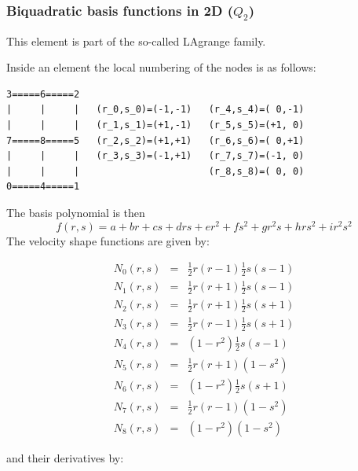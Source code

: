 \subsubsection{Biquadratic basis functions in 2D ($Q_2$)}

This element is part of the so-called LAgrange family. 

Inside an element the local numbering of the nodes is as follows:
\begin{verbatim}
3=====6=====2
|     |     |   (r_0,s_0)=(-1,-1)   (r_4,s_4)=( 0,-1)
|     |     |   (r_1,s_1)=(+1,-1)   (r_5,s_5)=(+1, 0)
7=====8=====5   (r_2,s_2)=(+1,+1)   (r_6,s_6)=( 0,+1)
|     |     |   (r_3,s_3)=(-1,+1)   (r_7,s_7)=(-1, 0)
|     |     |                       (r_8,s_8)=( 0, 0)
0=====4=====1
\end{verbatim}
The basis polynomial is then
\[
f(r,s) = a + br + cs + drs + er^2 + fs^2 + gr^2s + hrs^2 + i r^2s^2
\]
The velocity shape functions are given by:
\begin{mdframed}[backgroundcolor=blue!5]
\begin{eqnarray}
N_0(r,s)&=& \frac{1}{2}r(r-1)  \frac{1}{2}s(s-1)\nonumber\\
N_1(r,s)&=& \frac{1}{2}r(r+1)  \frac{1}{2}s(s-1)\nonumber\\
N_2(r,s)&=& \frac{1}{2}r(r+1)  \frac{1}{2}s(s+1)\nonumber\\
N_3(r,s)&=& \frac{1}{2}r(r-1)  \frac{1}{2}s(s+1)\nonumber\\
N_4(r,s)&=&     (1-r^2)  \frac{1}{2}s(s-1)\nonumber\\
N_5(r,s)&=& \frac{1}{2}r(r+1)      (1-s^2)\nonumber\\
N_6(r,s)&=&     (1-r^2)  \frac{1}{2}s(s+1)\nonumber\\
N_7(r,s)&=& \frac{1}{2}r(r-1)      (1-s^2)\nonumber\\
N_8(r,s)&=&     (1-r^2)      (1-s^2)\nonumber
\end{eqnarray}
\end{mdframed}
and their derivatives by:
